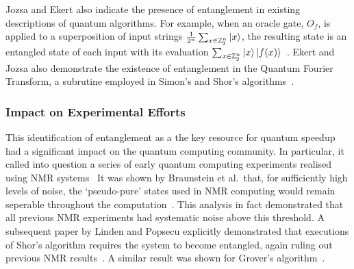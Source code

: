 \documentclass{standalone}
\begin{document}
\par
Jozsa and Ekert also indicate the presence of entanglement in existing descriptions of quantum algorithms. For example, when an oracle gate, $O_{f}$, is applied to a superposition of input strings $\frac{1}{2^{n}}\sum_{x\in\mathbb{Z}_{2}^{n}}\ket{x}$, the resulting state is an entangled state of each input with its evaluation $\sum_{x\in\mathbb{Z}_{2}^{n}}\ket{x}\ket{f(x)}$~\cite{Jozsa1997}. Ekert and Jozsa also demonstrate the existence of entanglement in the Quantum Fourier Transform, a subrutine employed in Simon's and Shor's algorithms~\cite{Ekert1998}.

\subsubsection*{Impact on Experimental Efforts}
This identification of entanglement as a the key resource for quantum speedup had a significant impact on the quantum computing community. In particular, it called into question a series of early quantum computing experiments realised using NMR systems~\cite{Braunstein1999,Linden2001} It was shown by Braunstein et al.\ that, for sufficiently high levels of noise, the `pseudo-pure' states used in NMR computing would remain seperable throughout the computation~\cite{Braunstein1999}. This analysis in fact demonstrated that all previous NMR experiments had systematic noise above this threshold. A subsequent paper by Linden and Popsecu explicitly demonstrated that executions of Shor's algorithm requires the system to become entangled, again ruling out previous NMR results~\cite{Linden2001}. A similar result was shown for Grover's algorithm~\cite{Braunstein2001}.
\end{document}
